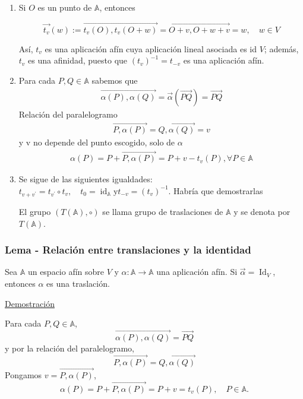 \documentclass[12pt, a4paper, ones, notitlepage, openany,titlepage]{article}
\newcommand{\demostracion}{\noindent\underline{Demostración}}
\begin{document}
\begin{enumerate}[label=(\arabic*)]
\item Si $O$ es un punto de $\mathbb{A}$, entonces

$$
\overrightarrow{t_{v}}(w):=\overrightarrow{t_{v}(O), t_{v}(O+w)}=\overrightarrow{O+v, O+w+v}=w, \quad w \in V
$$

Así, $t_{v}$ es una aplicación afín cuya aplicación lineal asociada es id $V$; además, $t_{v}$ es una afinidad, puesto que $\left(t_{v}\right)^{-1}=t_{-v}$ es una aplicación afín.

\item Para cada $P,Q\in\mathbb{A}$ sabemos que
\begin{gather*}
	\overrightarrow{\alpha(P),\alpha(Q)}=\vec{\alpha}(\overrightarrow{PQ}) = \overrightarrow{PQ}
\end{gather*}
Relación del paralelogramo
\begin{gather*}
	\overrightarrow{P,\alpha(P)} = \overrightarrow{Q,\alpha(Q)} = v
\end{gather*}
y v no depende del punto escogido, solo de $\alpha$
\begin{gather*}
	\alpha(P) = P+\overrightarrow{P,\alpha(P)} = P + v - t_{v}(P),\forall P\in\mathbb{A}
\end{gather*}

\item Se sigue de las siguientes igualdades: $t_{v+v^{\prime}}=t_{v^{\prime}} \circ t_{v}, \quad t_{0}=\operatorname{id}_{\mathbb{A}} \mathrm{y} t_{-v}=\left(t_{v}\right)^{-1}$. Habría que demostrarlas

El grupo $(T(\mathbb{A}), \circ)$ se llama grupo de traslaciones de $\mathbb{A}$ y se denota por $T(\mathbb{A})$.

\end{enumerate}


\subsubsection{Lema - Relación entre translaciones y la identidad}
Sea $\mathbb{A}$ un espacio afín sobre $V$ y $\alpha: \mathbb{A} \rightarrow \mathbb{A}$ una aplicación afín. Si $\vec{\alpha}=\operatorname{Id}_{V}$, entonces $\alpha$ es una traslación.

\demostracion

Para cada $P, Q \in \mathbb{A}$,
$$
\overrightarrow{\alpha(P), \alpha(Q)}=\overrightarrow{P Q}
$$
y por la relación del paralelogramo,
$$
\overrightarrow{P, \alpha(P)}=\overrightarrow{Q, \alpha(Q)}
$$
Pongamos $v=\overrightarrow{P, \alpha(P)}$,
$$
\alpha(P)=P+\overrightarrow{P, \alpha(P)}=P+v=t_{v}(P), \quad P \in \mathbb{A} .
$$
\end{document}
